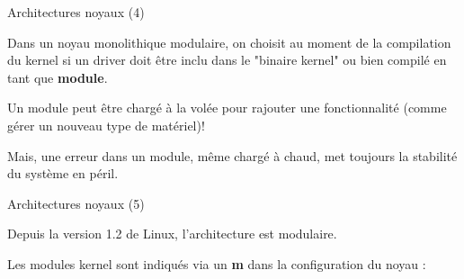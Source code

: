 \documentclass[12pt, t]{beamer}
\begin{document}
\begin{frame}{Architectures noyaux (4)}

    \vspace{15pt}
    Dans un noyau monolithique modulaire, on choisit au moment de la compilation
    du kernel si un driver doit être inclu dans le "binaire kernel" ou
    bien compilé en tant que {\textbf{module}}.

    {
        \vspace{15pt}
        Un module peut être chargé à la volée pour rajouter une fonctionnalité
        (comme gérer un nouveau type de matériel)!
    }

    {
        \vspace{15pt}
        Mais, une erreur dans un module, même chargé à chaud, met toujours la
        stabilité du système en péril.
    }

\end{frame}


\begin{frame}{Architectures noyaux (5)}

    \vspace{10pt}
    Depuis la version 1.2 de Linux, l'architecture est modulaire.

    {
        \vspace{10pt}
        Les modules kernel sont indiqués via un {\textbf{m}} dans la configuration
        du noyau :

        \vspace{8pt}
        \lstconf
    }

\end{frame}
\end{document}
